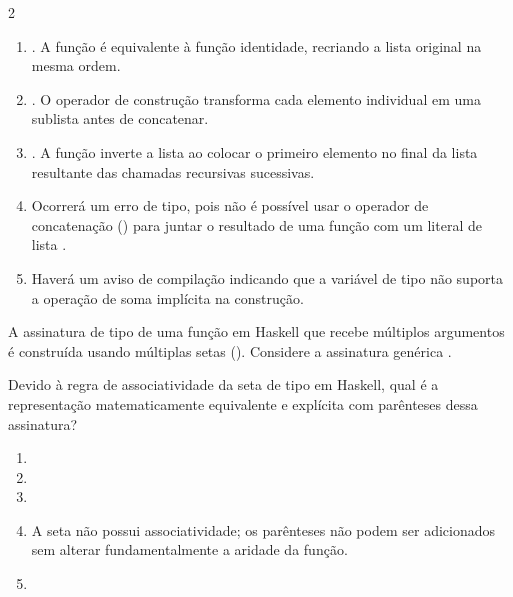 \documentclass[a4paper,10pt,brazil]{article}
\begin{document}
\begin{multicols}{2}
\begin{enumerate}
  \item \haskellinline{[1, 2, 3]}. A função é equivalente à função identidade, recriando a lista original na mesma ordem.

  \item \haskellinline{[[1], [2], [3]]}. O operador de construção transforma cada elemento individual em uma sublista antes de concatenar.

  \item \haskellinline{[3, 2, 1]}. A função inverte a lista ao colocar o primeiro elemento no final da lista resultante das chamadas recursivas sucessivas.

  \item Ocorrerá um erro de tipo, pois não é possível usar o operador de concatenação (\haskellinline{++}) para juntar o resultado de uma função com um literal de lista \haskellinline{[x]}.

  \item Haverá um aviso de compilação indicando que a variável de tipo  não suporta a operação de soma implícita na construção.


\end{enumerate}

A assinatura de tipo de uma função em Haskell que recebe múltiplos argumentos é construída usando múltiplas setas (\haskellinline{->}). Considere a assinatura genérica . 

Devido à regra de associatividade da seta de tipo em Haskell, qual é a representação matematicamente equivalente e explícita com parênteses dessa assinatura?

\begin{enumerate}
  \item {}

  \item {}

  \item {}

  \item A seta não possui associatividade; os parênteses não podem ser adicionados sem alterar fundamentalmente a aridade da função.

  \item {}



\end{enumerate}
\end{multicols}
\end{document}
